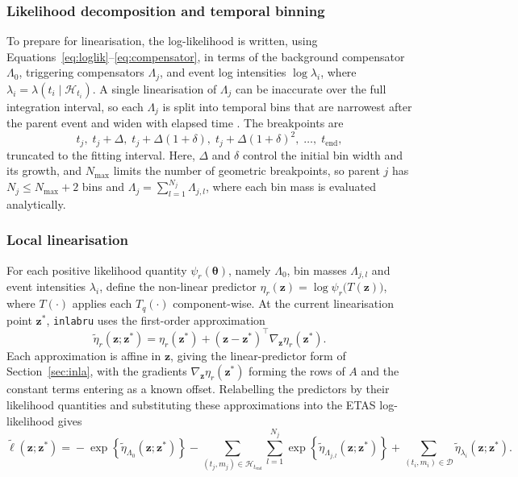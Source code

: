 \documentclass{statsmsc}
\begin{document}
\subsubsection{Likelihood decomposition and temporal binning} \label{sec:decomp}
To prepare for linearisation, the log-likelihood is written, using Equations~\eqref{eq:loglik}--\eqref{eq:compensator}, in terms of the background compensator $\Lambda_0$, triggering compensators $\Lambda_j$, and event log intensities $\log\lambda_i$, where $\lambda_i = \lambda(t_i \mid \mathcal{H}_{t_i})$. A single linearisation of $\Lambda_j$ can be inaccurate over the full integration interval, so each $\Lambda_j$ is split into temporal bins that are narrowest after the parent event and widen with elapsed time \citep{serafini2023approximation}. The breakpoints are
\begin{equation*}
t_j,\; t_j + \Delta,\; t_j + \Delta(1 + \delta),\; t_j + \Delta(1 + \delta)^2,\; \ldots,\; t_\mathrm{end},
\end{equation*}
truncated to the fitting interval. Here, $\Delta$ and $\delta$ control the initial bin width and its growth, and $N_{\mathrm{max}}$ limits the number of geometric breakpoints, so parent $j$ has $N_j \leq N_{\mathrm{max}}+2$ bins and $\Lambda_j = \sum_{l=1}^{N_j} \Lambda_{j,l}$, where each bin mass is evaluated analytically. 

\subsubsection{Local linearisation} \label{sec:local-lin}

For each positive likelihood quantity $\psi_r(\boldsymbol{\theta})$, namely $\Lambda_0$, bin masses $\Lambda_{j,l}$ and event intensities $\lambda_i$, define the non-linear predictor $\eta_r(\boldsymbol{z}) =\log \psi_r \big(T(\boldsymbol{z})\big)$, where $T(\cdot)$ applies each $T_q(\cdot)$ component-wise. 
At the current linearisation point $\boldsymbol{z}^\ast$, \texttt{inlabru} uses the first-order approximation \citep{lindgren2024inlabru}
\begin{equation*}
\widetilde{\eta}_r(\boldsymbol{z};\boldsymbol{z}^\ast) = \eta_r(\boldsymbol{z}^\ast) + (\boldsymbol z-\boldsymbol z^\ast)^\top\nabla_{\boldsymbol{z}}\eta_r(\boldsymbol{z}^\ast).
\end{equation*}
Each approximation is affine in $\boldsymbol{z}$, giving the linear-predictor form of Section~\ref{sec:inla}, with the gradients $\nabla_{\boldsymbol{z}}\eta_r(\boldsymbol{z}^\ast)$ forming the rows of $A$ and the constant terms entering as a known offset. Relabelling the predictors by their likelihood quantities and substituting these approximations into the ETAS log-likelihood gives 
\begin{equation} \label{eq:approx-likelihood}
\widetilde{\ell}(\boldsymbol z;\boldsymbol z^\ast)
={}
-\exp\left\{
    \widetilde{\eta}_{\Lambda_0}
    (\boldsymbol z;\boldsymbol z^\ast)
\right\}-
\sum_{(t_j,m_j)\in\mathcal{H}_{t_\mathrm{end}}}\sum_{l=1}^{N_j}
\exp\left\{
    \widetilde{\eta}_{\Lambda_{j,l}}
    (\boldsymbol z;\boldsymbol z^\ast)
\right\} +
\sum_{(t_i,m_i)\in\mathcal D}
\widetilde{\eta}_{\lambda_i}
(\boldsymbol z;\boldsymbol z^\ast).
\end{equation}
\end{document}
